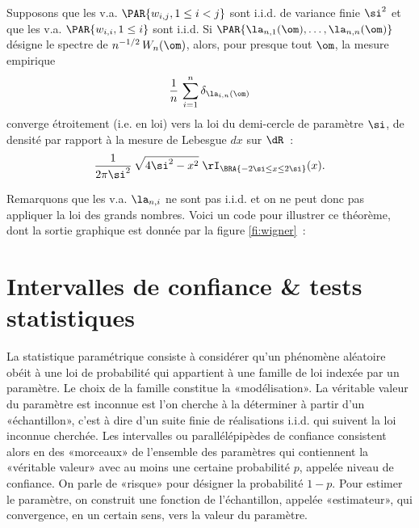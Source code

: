 \begin{thm}[Wigner]
  Supposons que les v.a. $\PAR{w_{i,j},1\leq i<j}$ sont i.i.d. de variance finie
  $\si^2$ et que les v.a. $\PAR{w_{i,i},1\leq i}$ sont i.i.d.  Si
  $\PAR{\la_{n,1}(\om),\ldots,\la_{n,n}(\om)}$ désigne le spectre de
  $n^{-1/2}\,W_n(\om)$, alors, pour presque tout $\om$, la mesure empirique
  $$
  \frac{1}{n}\,\sum_{i=1}^n\delta_{\la_{i,n}(\om)}
  $$
  converge étroitement (i.e. en loi) vers la loi du demi-cercle de
  paramètre $\si$, de densité par rapport à la mesure de Lebesgue $dx$ sur $\dR$~:
  $$
  \frac{1}{2\pi\si^2}\,\sqrt{4\si^2-x^2}\;\rI_{\BRA{-2\si\leq x \leq 2\si}}(x).
  $$
\end{thm}
Remarquons que les v.a. $\la_{n,i}$ ne sont pas i.i.d. et on ne peut donc pas
appliquer la loi des grands nombres. Voici un code \ML{} pour illustrer ce
théorème, dont la sortie graphique est donnée par la figure \ref{fi:wigner}~:
%
%
%

%
%
\chapter{Intervalles de confiance \& tests statistiques}
\label{ch:ic+tests}
%
%


La statistique paramétrique consiste à considérer qu'un phénomène aléatoire
obéit à une loi de probabilité qui appartient à une famille de loi indexée par
un paramètre. Le choix de la famille constitue la «modélisation». La véritable
valeur du paramètre est inconnue est l'on cherche à la déterminer à partir
d'un «échantillon», c'est à dire d'un suite finie de réalisations i.i.d. qui
suivent la loi inconnue cherchée. Les intervalles ou parallélépipèdes de
confiance consistent alors en des «morceaux» de l'ensemble des paramètres qui
contiennent la «véritable valeur» avec au moins une certaine probabilité $p$,
appelée niveau de confiance.  On parle de «risque» pour désigner la
probabilité $1-p$. Pour estimer le paramètre, on construit une fonction de
l'échantillon, appelée «estimateur», qui convergence, en un certain sens, vers
la valeur du paramètre.

